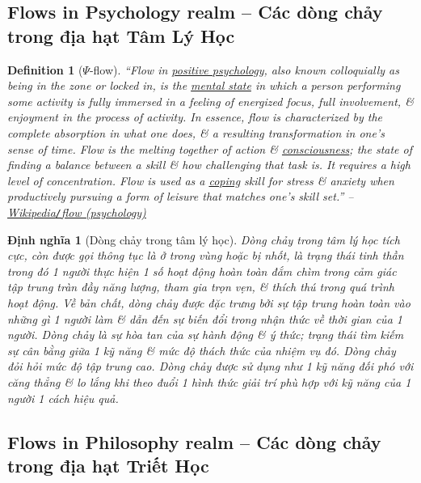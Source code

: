 \documentclass[12pt,twoside]{book}
\newtheorem{definition}{Definition}[section]
\newtheorem{dinhnghia}{Định nghĩa}[section]
\begin{document}
\subsection{Flows in Psychology realm -- Các dòng chảy trong địa hạt Tâm Lý Học}

\begin{definition}[$\Psi$-flow]
	``\emph{Flow} in \href{https://en.wikipedia.org/wiki/Positive_psychology}{positive psychology}, also known colloquially as being \emph{in the zone} or \emph{locked in}, is the \href{https://en.wikipedia.org/wiki/Mental_state}{mental state} in which a person performing some activity is fully immersed in a feeling of energized focus, full involvement, \& enjoyment in the process of activity. In essence, flow is characterized by the complete absorption in what one does, \& a resulting transformation in one's sense of time. Flow is the melting together of action \& \href{https://en.wikipedia.org/wiki/Consciousness}{consciousness}; the state of finding a balance between a skill \& how challenging that task is. It requires a high level of concentration. Flow is used as a \href{https://en.wikipedia.org/wiki/Coping}{coping} skill for stress \& anxiety when productively pursuing a form of leisure  that matches one's skill set.'' -- \href{https://en.wikipedia.org/wiki/Flow_(psychology)}{Wikipedia{\tt/}flow (psychology)}
\end{definition}

\begin{dinhnghia}[Dòng chảy trong tâm lý học]
	\emph{Dòng chảy} trong tâm lý học tích cực, còn được gọi thông tục là \emph{ở trong vùng} hoặc \emph{bị nhốt}, là trạng thái tinh thần trong đó 1 người thực hiện 1 số hoạt động hoàn toàn đắm chìm trong cảm giác tập trung tràn đầy năng lượng, tham gia trọn vẹn, \& thích thú trong quá trình hoạt động. Về bản chất, dòng chảy được đặc trưng bởi sự tập trung hoàn toàn vào những gì 1 người làm \& dẫn đến sự biến đổi trong nhận thức về thời gian của 1 người. Dòng chảy là sự hòa tan của sự hành động \& ý thức; trạng thái tìm kiếm sự cân bằng giữa 1 kỹ năng \& mức độ thách thức của nhiệm vụ đó. Dòng chảy đỏi hỏi mức độ tập trung cao. Dòng chảy được sử dụng như 1 kỹ năng đối phó với căng thẳng \& lo lắng khi theo đuổi 1 hình thức giải trí phù hợp với kỹ năng của 1 người 1 cách hiệu quả. 
\end{dinhnghia}

\subsection{Flows in Philosophy realm -- Các dòng chảy trong địa hạt Triết Học}
\end{document}
